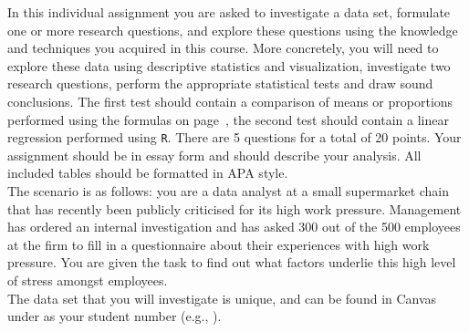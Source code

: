 {\footnotesize

In this individual assignment you are asked to investigate a data set, formulate one or more research questions, and explore these questions using the knowledge and techniques you acquired in this course. More concretely, you will need to explore these data using descriptive statistics and visualization, investigate two research questions, perform the appropriate statistical tests and draw sound conclusions. The first test should contain a comparison of means or proportions performed using the formulas on page~\pageref{formulasheet}, the second test should contain a linear regression performed using \texttt{R}. There are 5 questions for a total of 20 points. Your assignment should be in essay form and should describe your analysis. All included tables should be formatted in APA style. \\

The scenario is as follows: you are a data analyst at a small supermarket chain that has recently been publicly criticised for its high work pressure. Management has ordered an internal investigation and has asked 300 out of the 500 employees at the firm to fill in a questionnaire about their experiences with high work pressure. You are given the task to find out what factors underlie this high level of stress amongst employees. \\

The data set that you will investigate is unique, and can be found in Canvas under as your student number (e.g., ). \\

}
